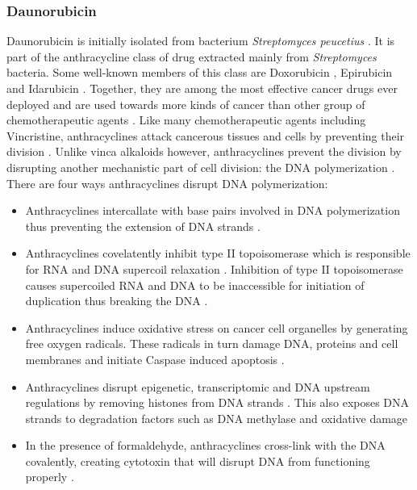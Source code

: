 \documentclass[pdftex,12pt,a4paper]{report}
\begin{document}
\subsubsection*{Daunorubicin}

Daunorubicin is initially isolated from bacterium \textit{Streptomyces peucetius} \cite{otten1990cloning, lin2011chiral}. It is part of the anthracycline class of drug \cite{gewirtz1999critical} extracted mainly from \textit{Streptomyces} bacteria. Some well-known members of this class are Doxorubicin \cite{nci2018defdoxorubicin}, Epirubicin \cite{nci2018defepirubicin} and Idarubicin \cite{nci2018defidarubicin}. Together, they are among the most effective cancer drugs ever deployed and are used towards more kinds of cancer than other group of chemotherapeutic agents \cite{weiss1992anthracyclines, minotti2004anthracyclines, peng2005cardiotoxicology}. Like many chemotherapeutic agents including Vincristine, anthracyclines attack cancerous tissues and cells by preventing their division \cite{drugs2018defdaunorubicin}. Unlike vinca alkaloids however, anthracyclines prevent the division by disrupting another mechanistic part of cell division: the DNA polymerization \cite{gewirtz1999critical}. There are four ways anthracyclines disrupt DNA polymerization:

\begin{itemize}
\item Anthracyclines intercallate with base pairs involved in DNA polymerization thus preventing the extension of DNA strands \cite{takimoto2008principles}.

\item Anthracyclines covelatently inhibit type II topoisomerase which is responsible for RNA and DNA supercoil relaxation \cite{wang2002cellular}. Inhibition of type II topoisomerase causes supercoiled RNA and DNA to be inaccessible for initiation of duplication thus breaking the DNA \cite{tewey1984adriamycin}.

\item Anthracyclines induce oxidative stress on cancer cell organelles by generating free oxygen radicals. These radicals in turn damage DNA, proteins and cell membranes and initiate Caspase induced apoptosis \cite{vsimuunek2009anthracycline, halliwell1994free}.

\item Anthracyclines disrupt epigenetic, transcriptomic and DNA upstream regulations by removing histones from DNA strands \cite{pang2013drug}. This also exposes DNA strands to degradation factors such as DNA methylase \cite{vaissiere2008epigenetic} and oxidative damage \cite{ljungman1992efficient}

\item In the presence of formaldehyde, anthracyclines cross-link with the DNA covalently, creating cytotoxin that will disrupt DNA from functioning properly \cite{wang1991formaldehyde}.
\end{itemize}
\end{document}
